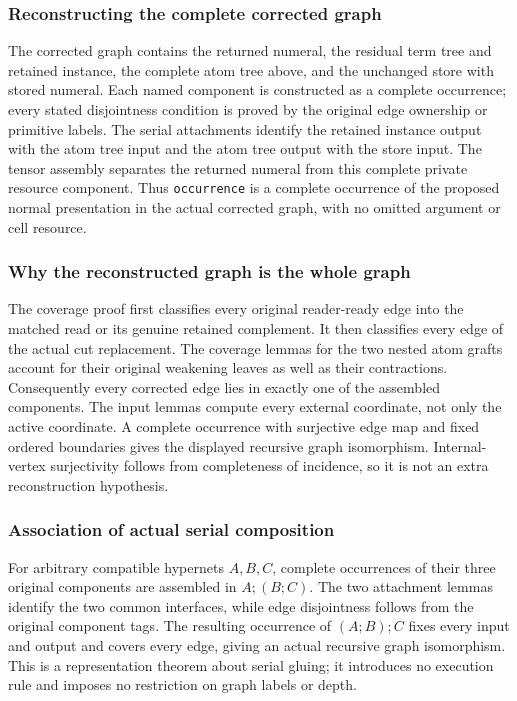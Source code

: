 \subsubsection{Reconstructing the complete corrected graph}
The corrected graph contains the returned numeral, the residual term tree and retained instance, the complete atom tree above, and the unchanged store with stored numeral.  Each named component is constructed as a complete occurrence; every stated disjointness condition is proved by the original edge ownership or primitive labels.  The serial attachments identify the retained instance output with the atom tree input and the atom tree output with the store input.  The tensor assembly separates the returned numeral from this complete private resource component.  Thus \texttt{occurrence} is a complete occurrence of the proposed normal presentation in the actual corrected graph, with no omitted argument or cell resource.

\subsubsection{Why the reconstructed graph is the whole graph}
The coverage proof first classifies every original reader-ready edge into the matched read or its genuine retained complement.  It then classifies every edge of the actual cut replacement.  The coverage lemmas for the two nested atom grafts account for their original weakening leaves as well as their contractions.  Consequently every corrected edge lies in exactly one of the assembled components.  The input lemmas compute every external coordinate, not only the active coordinate.  A complete occurrence with surjective edge map and fixed ordered boundaries gives the displayed recursive graph isomorphism.  Internal-vertex surjectivity follows from completeness of incidence, so it is not an extra reconstruction hypothesis.

\subsubsection{Association of actual serial composition}
For arbitrary compatible hypernets $A,B,C$, complete occurrences of their three original components are assembled in $A;(B;C)$.  The two attachment lemmas identify the two common interfaces, while edge disjointness follows from the original component tags.  The resulting occurrence of $(A;B);C$ fixes every input and output and covers every edge, giving an actual recursive graph isomorphism.  This is a representation theorem about serial gluing; it introduces no execution rule and imposes no restriction on graph labels or depth.

